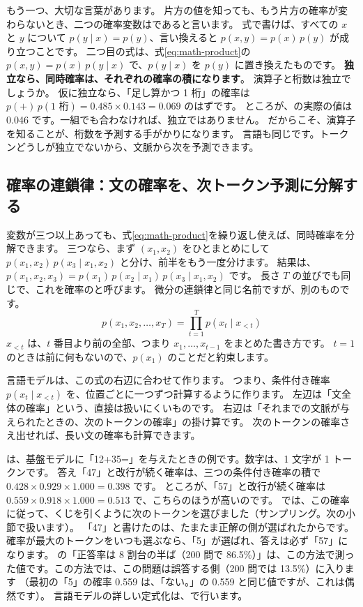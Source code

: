 もう一つ、大切な言葉があります。
片方の値を知っても、もう片方の確率が変わらないとき、二つの確率変数はであると言います。
式で書けば、すべての $x$ と $y$ について $p(y\mid x)=p(y)$、言い換えると $p(x,y)=p(x)\,p(y)$ が成り立つことです。
二つ目の式は、式\eqref{eq:math-product}の $p(x,y)=p(x)\,p(y\mid x)$ で、$p(y\mid x)$ を $p(y)$ に置き換えたものです。
\textbf{独立なら、同時確率は、それぞれの確率の積になります}。
演算子と桁数は独立でしょうか。
仮に独立なら、「足し算かつ 1 桁」の確率は $p(+)\,p(\text{1 桁})=0.485\times 0.143=0.069$ のはずです。
ところが、の実際の値は 0.046 です。一組でも合わなければ、独立ではありません。
だからこそ、演算子を知ることが、桁数を予測する手がかりになります。
言語も同じです。トークンどうしが独立でないから、文脈から次を予測できます。

\subsection*{確率の連鎖律：文の確率を、次トークン予測に分解する}

変数が三つ以上あっても、式\eqref{eq:math-product}を繰り返し使えば、同時確率を分解できます。
三つなら、まず $(x_1,x_2)$ をひとまとめにして $p(x_1,x_2)\,p(x_3\mid x_1,x_2)$ と分け、前半をもう一度分けます。
結果は、$p(x_1,x_2,x_3)=p(x_1)\,p(x_2\mid x_1)\,p(x_3\mid x_1,x_2)$ です。
長さ $T$ の並びでも同じで、これを確率のと呼びます。
微分の連鎖律と同じ名前ですが、別のものです。
\begin{equation}
p(x_1,x_2,\dots,x_T)=\prod_{t=1}^{T}p(x_t\mid x_{<t})
\label{eq:math-prob-chain}
\end{equation}
$x_{<t}$ は、$t$ 番目より前の全部、つまり $x_1,\dots,x_{t-1}$ をまとめた書き方です。
$t=1$ のときは前に何もないので、$p(x_1)$ のことだと約束します。

言語モデルは、この式の右辺に合わせて作ります。
つまり、条件付き確率 $p(x_t\mid x_{<t})$ を、位置ごとに一つずつ計算するように作ります。
左辺は「文全体の確率」という、直接は扱いにくいものです。
右辺は「それまでの文脈が与えられたときの、次のトークンの確率」の掛け算です。
次のトークンの確率さえ出せれば、長い文の確率も計算できます。

は、基盤モデルに「12+35=」を与えたときの例です。数字は、1 文字が 1 トークンです。
答え「47」と改行が続く確率は、三つの条件付き確率の積で $0.428\times 0.929\times 1.000=0.398$ です。
ところが、「57」と改行が続く確率は $0.559\times 0.918\times 1.000=0.513$ で、こちらのほうが高いのです。
では、この確率に従って、くじを引くように次のトークンを選びました（サンプリング。次の小節で扱います）。
「47」と書けたのは、たまたま正解の側が選ばれたからです。
確率が最大のトークンをいつも選ぶなら、「5」が選ばれ、答えは必ず「57」になります。
の「正答率は 8 割台の半ば（200 問で 86.5\%）」は、この方法で測った値です。この方法では、この問題は誤答する側（200 問では 13.5\%）に入ります
（最初の「5」の確率 0.559 は、「ない。」の 0.559 と同じ値ですが、これは偶然です）。
言語モデルの詳しい定式化は、で行います。

